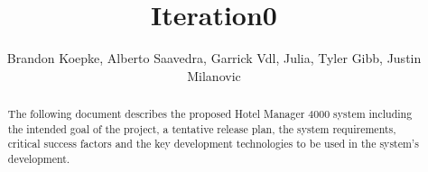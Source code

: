 \begin{frontmatter}
	\title{Iteration0}
	\author{Brandon Koepke, Alberto Saavedra, Garrick Vdl, Julia, Tyler Gibb, Justin Milanovic}
	\begin{abstract}
		The following document describes the proposed Hotel Manager 4000 system including the intended goal of the project, a tentative release plan, the system requirements, critical success factors and the key development technologies to be used in the system's development.
	\end{abstract}
\end{frontmatter}
\tableofcontents
\clearpage
